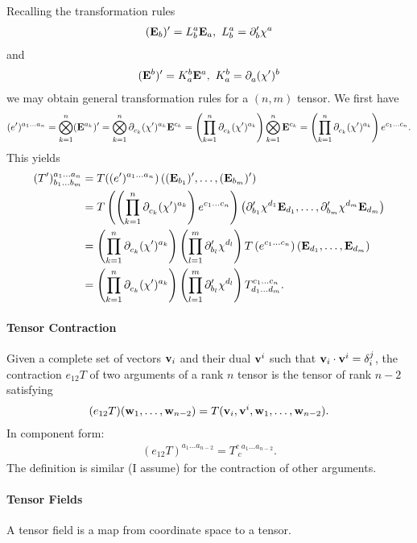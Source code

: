 Recalling the transformation rules
\begin{align*}
	(\tb{b})' = L_{b}^{a}\tb{a},\ L_{b}^{a} = \del[\prime]{b}{\chi^{a}}
\end{align*}
and
\begin{align*}
	(\db{b})' = K_{a}^{b}\db{a},\ K_{a}^{b} = \del{a}{(\chi')^{b}}
\end{align*}
we may obtain general transformation rules for a $(n, m)$ tensor. We first have
\begin{align*}
	(e^{\prime})^{a_{1}\dots a_{n}} = \bigotimes\limits_{k = 1}^{n}(\db{a_{k}})^{\prime} = \bigotimes\limits_{k = 1}^{n}\del{c_{k}}{(\chi')^{a_{k}}}\db{c_{k}} = \left(\prod\limits_{k = 1}^{n}\del{c_{k}}{(\chi')^{a_{k}}}\right)\bigotimes\limits_{k = 1}^{n}\db{c_{k}} = \left(\prod\limits_{k = 1}^{n}\del{c_{k}}{(\chi')^{a_{k}}}\right)e^{c_{1}\dots c_{n}}.
\end{align*}
This yields
\begin{align*}
	\tensor*{(T^{\prime})}{^{a_{1}\dots a_{n}}_{b_{1}\dots b_{m}}} &= T((e^{\prime})^{a_{1}\dots a_{n}})\left((\tb{b_{1}})^{\prime}, \dots, (\tb{b_{m}})^{\prime}\right)\\
	&= T\left(\left(\prod\limits_{k = 1}^{n}\del{c_{k}}{(\chi')^{a_{k}}}\right)e^{c_{1}\dots c_{n}}\right)\left(\del[\prime]{b_{1}}{\chi^{d_{1}}}\tb{d_{1}}, \dots, \del[\prime]{b_{m}}{\chi^{d_{m}}}\tb{d_{m}}\right) \\
	&= \left(\prod\limits_{k = 1}^{n}\del{c_{k}}{(\chi')^{a_{k}}}\right)\left(\prod\limits_{l = 1}^{m}\del[\prime]{b_{l}}{\chi^{d_{l}}}\right)T\left(e^{c_{1}\dots c_{n}}\right)\left(\tb{d_{1}}, \dots, \tb{d_{m}}\right) \\
	&= \left(\prod\limits_{k = 1}^{n}\del{c_{k}}{(\chi')^{a_{k}}}\right)\left(\prod\limits_{l = 1}^{m}\del[\prime]{b_{l}}{\chi^{d_{l}}}\right)\tensor*{T}{^{c_{1}\dots c_{n}}_{d_{1}\dots d_{m}}}.
\end{align*}

\paragraph{Tensor Contraction}
Given a complete set of vectors $\vb{v}_{i}$ and their dual $\vb{v}^{i}$ such that $\vb{v}_{i}\cdot\vb{v}^{i} = \kdelta{i}{j}$, the contraction $e_{12}T$ of two arguments of a rank $n$ tensor is the tensor of rank $n - 2$ satisfying
\begin{align*}
	(e_{12}T)(\vb{w}_{1}, \dots, \vb{w}_{n - 2}) = T(\vb{v}_{i}, \vb{v}^{i}, \vb{w}_{1}, \dots, \vb{w}_{n - 2}).
\end{align*}
In component form:
\begin{align*}
	(e_{12}T)^{a_{1}\dots a_{n - 2}} = T^{c\;a_{1}\dots a_{n - 2}}_{\;c}.
\end{align*}
The definition is similar (I assume) for the contraction of other arguments.

\paragraph{Tensor Fields}
A tensor field is a map from coordinate space to a tensor.